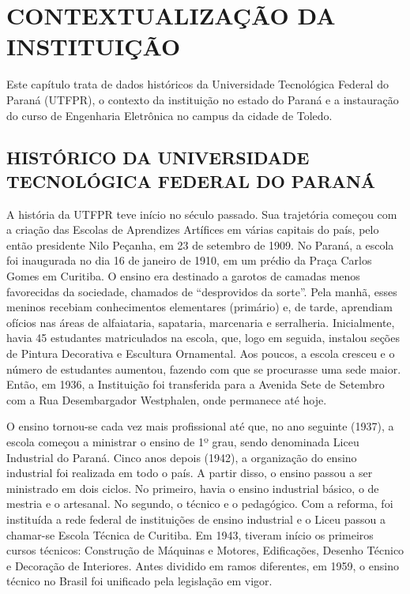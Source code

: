 \chapter{CONTEXTUALIZAÇÃO DA INSTITUIÇÃO}
\label{chap:contex}

Este capítulo trata de dados históricos da Universidade Tecnológica Federal do Paraná (UTFPR), o contexto da instituição no estado do Paraná e a instauração do curso de Engenharia Eletrônica no campus da cidade de Toledo.

\section{HISTÓRICO DA UNIVERSIDADE TECNOLÓGICA FEDERAL DO PARANÁ}
\label{sec:hist}

A história da UTFPR teve início no século passado. Sua trajetória começou com a criação das Escolas de Aprendizes Artífices em várias capitais do país, pelo então presidente Nilo Peçanha, em 23 de setembro de 1909. No Paraná, a escola foi inaugurada no dia 16 de janeiro de 1910, em um prédio da Praça Carlos Gomes em Curitiba. O ensino era destinado a garotos de camadas menos favorecidas da sociedade, chamados de ``desprovidos da sorte''. Pela manhã, esses meninos recebiam conhecimentos elementares (primário) e, de tarde, aprendiam ofícios nas áreas de alfaiataria, sapataria, marcenaria e serralheria. Inicialmente, havia 45 estudantes matriculados na escola, que, logo em seguida, instalou seções de Pintura Decorativa e Escultura Ornamental. Aos poucos, a escola cresceu e o número de estudantes aumentou, fazendo com que se procurasse uma sede maior. Então, em 1936, a Instituição foi transferida para a Avenida Sete de Setembro com a Rua Desembargador Westphalen, onde permanece até hoje.

O ensino tornou-se cada vez mais profissional até que, no ano seguinte (1937), a escola começou a ministrar o ensino de 1º grau, sendo denominada Liceu Industrial do Paraná. Cinco anos depois (1942), a organização do ensino industrial foi realizada em todo o país. A partir disso, o ensino passou a ser ministrado em dois ciclos. No primeiro, havia o ensino industrial básico, o de mestria e o artesanal. No segundo, o técnico e o pedagógico. Com a reforma, foi instituída a rede federal de instituições de ensino industrial e o Liceu passou a chamar-se Escola Técnica de Curitiba. Em 1943, tiveram início os primeiros cursos técnicos: Construção de Máquinas e Motores, Edificações, Desenho Técnico e Decoração de Interiores. Antes dividido em ramos diferentes, em 1959, o ensino técnico no Brasil foi unificado pela legislação em vigor.

